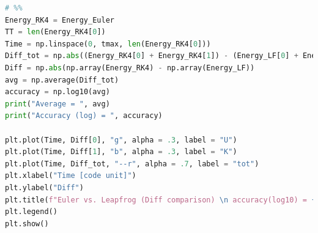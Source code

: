 \documentclass[12pt]{article}
\begin{document}
\begin{lstlisting}[language={Python}]
# %%
Energy_RK4 = Energy_Euler
TT = len(Energy_RK4[0])
Time = np.linspace(0, tmax, len(Energy_RK4[0]))
Diff_tot = np.abs((Energy_RK4[0] + Energy_RK4[1]) - (Energy_LF[0] + Energy_LF[1]))
Diff = np.abs(np.array(Energy_RK4) - np.array(Energy_LF))
avg = np.average(Diff_tot)
accuracy = np.log10(avg)
print("Average = ", avg)
print("Accuracy (log) = ", accuracy)

plt.plot(Time, Diff[0], "g", alpha = .3, label = "U")
plt.plot(Time, Diff[1], "b", alpha = .3, label = "K")
plt.plot(Time, Diff_tot, "--r", alpha = .7, label = "tot")
plt.xlabel("Time [code unit]")
plt.ylabel("Diff")
plt.title(f"Euler vs. Leapfrog (Diff comparison) \n accuracy(log10) = {np.round(accuracy, 5)}")
plt.legend()
plt.show()



      \end{lstlisting}
\end{document}
